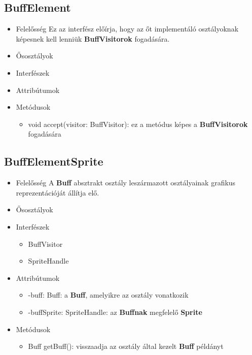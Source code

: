 \subsection{BuffElement}
\begin{itemize}
\item Felelősség \newline
    Ez az interfész előírja, hogy az őt implementáló osztályoknak képesnek kell lenniük \textbf{BuffVisitorok} fogadására. 
\item Ősosztályok
\item Interfészek
\item Attribútumok
\item Metódusok
	\begin{itemize}
        \item void accept(visitor: BuffVisitor): ez a metódus képes a \textbf{BuffVisitorok} fogadására
	\end{itemize}
\end{itemize}

\subsection{BuffElementSprite}
\begin{itemize}
\item Felelősség \newline
    A \textbf{Buff} absztrakt osztály leszármazott osztályainak grafikus reprezentációját állítja elő.
\item Ősosztályok
\item Interfészek
    \begin{itemize}
        \item BuffVisitor
        \item SpriteHandle
    \end{itemize}
\item Attribútumok
    \begin{itemize}
        \item -buff: Buff: a \textbf{Buff}, amelyikre az osztály vonatkozik
        \item -buffSprite: SpriteHandle: az \textbf{Buffnak} megfelelő \textbf{Sprite}
    \end{itemize}
\item Metódusok
	\begin{itemize}
        \item Buff getBuff(): visszaadja az osztály által kezelt \textbf{Buff} példányt
	\end{itemize}
\end{itemize}

